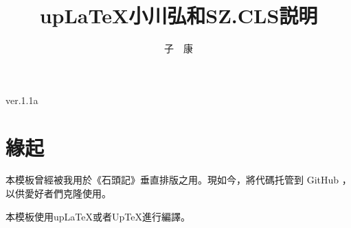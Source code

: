 \documentclass[uplatex,a4paper,10pt]{ujarticle}
\begin{document}


\mcfamily


\title{\mcfamily\bfseries{up\LaTeX}{小川弘和}{SZ.CLS}{説明}}
\author{子　康}
\maketitle
\begin{center}
{\fontsize{10pt}{12}\selectfont\ttfamily
ver.1.1a
}
\end{center}
\vskip20mm



\section{緣起}
\par 本模板曾經被我用於《石頭記》垂直排版之用。現如今，將代碼托管到 GitHub ，
以供愛好者們克隆使用。
\par 本模板使用{up\LaTeX}或者{Up\TeX}進行編譯。











\end{document}

